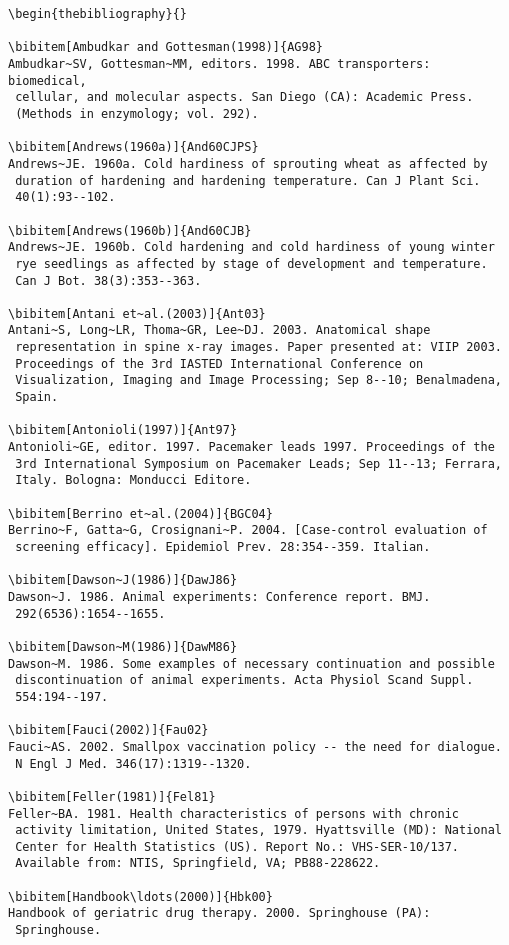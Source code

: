 \documentclass[]{interact}
\theoremstyle{plain}%
\theoremstyle{definition}
\theoremstyle{remark}
\begin{document}
\begin{verbatim}
\begin{thebibliography}{}

\bibitem[Ambudkar and Gottesman(1998)]{AG98}
Ambudkar~SV, Gottesman~MM, editors. 1998. ABC transporters: biomedical,
 cellular, and molecular aspects. San Diego (CA): Academic Press.
 (Methods in enzymology; vol. 292).

\bibitem[Andrews(1960a)]{And60CJPS}
Andrews~JE. 1960a. Cold hardiness of sprouting wheat as affected by
 duration of hardening and hardening temperature. Can J Plant Sci.
 40(1):93--102.

\bibitem[Andrews(1960b)]{And60CJB}
Andrews~JE. 1960b. Cold hardening and cold hardiness of young winter
 rye seedlings as affected by stage of development and temperature.
 Can J Bot. 38(3):353--363.

\bibitem[Antani et~al.(2003)]{Ant03}
Antani~S, Long~LR, Thoma~GR, Lee~DJ. 2003. Anatomical shape
 representation in spine x-ray images. Paper presented at: VIIP 2003.
 Proceedings of the 3rd IASTED International Conference on
 Visualization, Imaging and Image Processing; Sep 8--10; Benalmadena,
 Spain.

\bibitem[Antonioli(1997)]{Ant97}
Antonioli~GE, editor. 1997. Pacemaker leads 1997. Proceedings of the
 3rd International Symposium on Pacemaker Leads; Sep 11--13; Ferrara,
 Italy. Bologna: Monducci Editore.

\bibitem[Berrino et~al.(2004)]{BGC04}
Berrino~F, Gatta~G, Crosignani~P. 2004. [Case-control evaluation of
 screening efficacy]. Epidemiol Prev. 28:354--359. Italian.

\bibitem[Dawson~J(1986)]{DawJ86}
Dawson~J. 1986. Animal experiments: Conference report. BMJ.
 292(6536):1654--1655.

\bibitem[Dawson~M(1986)]{DawM86}
Dawson~M. 1986. Some examples of necessary continuation and possible
 discontinuation of animal experiments. Acta Physiol Scand Suppl.
 554:194--197.

\bibitem[Fauci(2002)]{Fau02}
Fauci~AS. 2002. Smallpox vaccination policy -- the need for dialogue.
 N Engl J Med. 346(17):1319--1320.

\bibitem[Feller(1981)]{Fel81}
Feller~BA. 1981. Health characteristics of persons with chronic
 activity limitation, United States, 1979. Hyattsville (MD): National
 Center for Health Statistics (US). Report No.: VHS-SER-10/137.
 Available from: NTIS, Springfield, VA; PB88-228622.

\bibitem[Handbook\ldots(2000)]{Hbk00}
Handbook of geriatric drug therapy. 2000. Springhouse (PA):
 Springhouse.


\end{verbatim}
\end{document}
